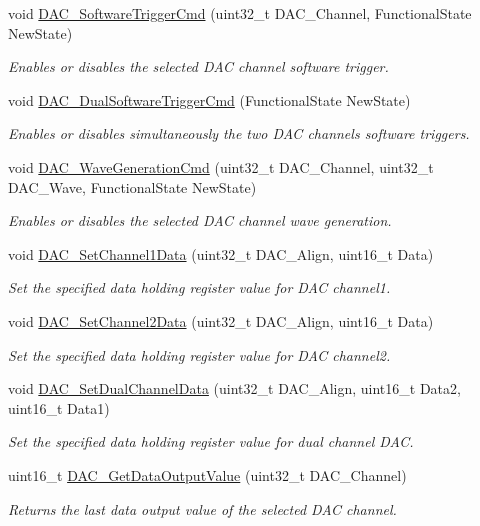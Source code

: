 \begin{DoxyCompactItemize}
void \hyperlink{group___d_a_c___group1_ga46f9f7f6b9520a86e300fe966afe5fb3}{D\+A\+C\+\_\+\+Software\+Trigger\+Cmd} (uint32\+\_\+t D\+A\+C\+\_\+\+Channel, Functional\+State New\+State)
\begin{DoxyCompactList}\small\item\em Enables or disables the selected D\+AC channel software trigger. \end{DoxyCompactList}\item 
void \hyperlink{group___d_a_c___group1_gab4d3b364a6b184dcd65f3b294ebf56dc}{D\+A\+C\+\_\+\+Dual\+Software\+Trigger\+Cmd} (Functional\+State New\+State)
\begin{DoxyCompactList}\small\item\em Enables or disables simultaneously the two D\+AC channels software triggers. \end{DoxyCompactList}\item 
void \hyperlink{group___d_a_c___group1_gabd51ae6880821d4dcd923969ec19a19e}{D\+A\+C\+\_\+\+Wave\+Generation\+Cmd} (uint32\+\_\+t D\+A\+C\+\_\+\+Channel, uint32\+\_\+t D\+A\+C\+\_\+\+Wave, Functional\+State New\+State)
\begin{DoxyCompactList}\small\item\em Enables or disables the selected D\+AC channel wave generation. \end{DoxyCompactList}\item 
void \hyperlink{group___d_a_c___group1_gad06b4230d2b17d1d13f41dce4c782461}{D\+A\+C\+\_\+\+Set\+Channel1\+Data} (uint32\+\_\+t D\+A\+C\+\_\+\+Align, uint16\+\_\+t Data)
\begin{DoxyCompactList}\small\item\em Set the specified data holding register value for D\+AC channel1. \end{DoxyCompactList}\item 
void \hyperlink{group___d_a_c___group1_ga44e12006ec186791378d132da8541552}{D\+A\+C\+\_\+\+Set\+Channel2\+Data} (uint32\+\_\+t D\+A\+C\+\_\+\+Align, uint16\+\_\+t Data)
\begin{DoxyCompactList}\small\item\em Set the specified data holding register value for D\+AC channel2. \end{DoxyCompactList}\item 
void \hyperlink{group___d_a_c___group1_ga4ca2cfdf56ab35a23f2517f23d7fbb24}{D\+A\+C\+\_\+\+Set\+Dual\+Channel\+Data} (uint32\+\_\+t D\+A\+C\+\_\+\+Align, uint16\+\_\+t Data2, uint16\+\_\+t Data1)
\begin{DoxyCompactList}\small\item\em Set the specified data holding register value for dual channel D\+AC. \end{DoxyCompactList}\item 
uint16\+\_\+t \hyperlink{group___d_a_c___group1_ga51274838de1e5dd012a82d7f44d7a50b}{D\+A\+C\+\_\+\+Get\+Data\+Output\+Value} (uint32\+\_\+t D\+A\+C\+\_\+\+Channel)
\begin{DoxyCompactList}\small\item\em Returns the last data output value of the selected D\+AC channel. \end{DoxyCompactList}\end{DoxyCompactItemize}


